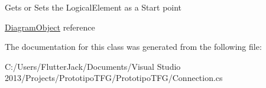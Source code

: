 Gets or Sets the Logical\+Element as a Start point 

\hyperlink{class_prototipo_t_f_g_1_1_diagram_object}{Diagram\+Object} reference

The documentation for this class was generated from the following file\+:\begin{DoxyCompactItemize}
\item 
C\+:/\+Users/\+Flutter\+Jack/\+Documents/\+Visual Studio 2013/\+Projects/\+Prototipo\+T\+F\+G/\+Prototipo\+T\+F\+G/Connection.\+cs\end{DoxyCompactItemize}
